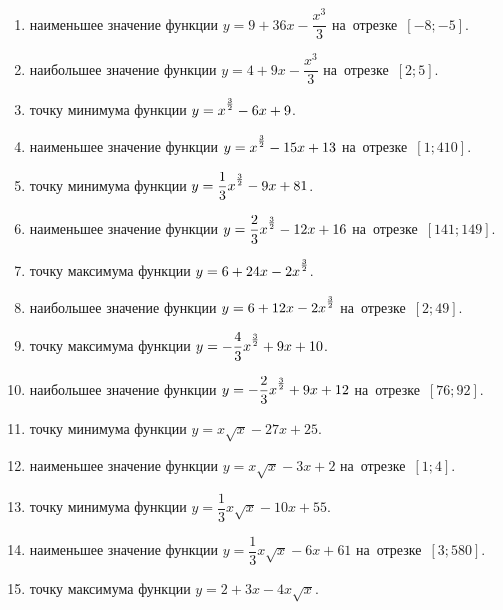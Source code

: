 \documentclass[a4paper,10pt]{article}
\begin{document}
\begin{enumerate}
\item {} наименьшее значение функции $y=9 +36x-\dfrac{x^3}{3}$ на~отрезке~$\left[-8;-5\right]$.

\item {} наибольшее значение функции $y=4 +9x-\dfrac{x^3}{3}$ на~отрезке~$\left[2;5\right]$.

\item {} точку минимума функции $y=x\strut^{\frac{3}{2}} -6x+9$.

\item {} наименьшее значение функции $y=x\strut^{\frac{3}{2}} -15x+13$ на~отрезке~$\left[1;410\right]$.

\item {} точку минимума функции $y=\dfrac{1}{3}x\strut^{\frac{3}{2}} -9x+81$.

\item {} наименьшее значение функции $y=\dfrac{2}{3}x\strut^{\frac{3}{2}} -12x+16$ на~отрезке~$\left[141;149\right]$.

\item {} точку максимума функции $y=6+24x-2x\strut^{\frac{3}{2}}$.

\item {} наибольшее значение функции $y=6+12x-2x\strut^{\frac{3}{2}}$ на~отрезке~$\left[2;49\right]$.

\item {} точку максимума функции $y=-\dfrac{4}{3}x\strut^{\frac{3}{2}} +9x+10$.

\item {} наибольшее значение функции $y=-\dfrac{2}{3}x\strut^{\frac{3}{2}} +9x+12$ на~отрезке~$\left[76;92\right]$.

\item {} точку минимума функции $y=x\sqrt{x} -27x+25$.

\item {} наименьшее значение функции $y=x\sqrt{x} -3x+2$ на~отрезке~$\left[1;4\right]$.

\item {} точку минимума функции $y=\dfrac{1}{3}x\sqrt{x} -10x+55$.

\item {} наименьшее значение функции $y=\dfrac{1}{3}x\sqrt{x} -6x+61$ на~отрезке~$\left[3;580\right]$.

\item {} точку максимума функции $y=2+3x -4x\sqrt{x}$.


\end{enumerate}
\end{document}
